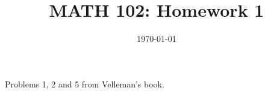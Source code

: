 \documentclass[12pt]{amsart}
\title{ MATH 102: Homework 1}
\date{\today}
\begin{document}
\maketitle

Problems 1, 2 and 5 from Velleman's book.



\printbibliography 
%
%
\end{document}
